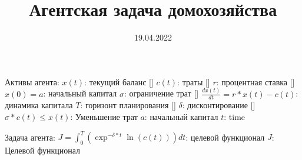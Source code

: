 \documentclass{a_model}
\title{Агентская задача домохозяйства}
\date{19.04.2022}
\begin{document}
Активы агента:
    $x(t)$: текущий баланс []
    $c(t)$: траты []
    $r$: процентная ставка []
    $x(0) = a$: начальный капитал
    $\sigma$: ограничение трат []
    $\frac{dx(t)}{dt} = r*x(t)-c(t)$: динамика капитала
    $T$: горизонт планирования []
    $\delta$: дисконтирование []
    $\sigma*c(t)\leq x(t)$: Уменьшение трат
    $a$: начальный капитал
    $t$: time

Задача агента:
    $J = \int_0^T (\exp^{-\delta*t} \ln(c(t)))dt$: целевой функционал
    $J$: Целевой функционал
\end{document}
